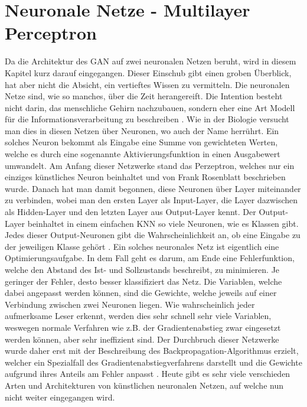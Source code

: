 \section{Neuronale Netze - Multilayer Perceptron}
Da die Architektur des \Gls{GAN} auf zwei neuronalen Netzen beruht, wird in diesem Kapitel kurz darauf eingegangen. Dieser
Einschub gibt einen groben Überblick, hat aber nicht die Absicht, ein vertieftes Wissen zu vermitteln.
\para
Die neuronalen Netze sind, wie so manches, über die Zeit herangereift. Die Intention besteht nicht darin, das menschliche Gehirn
nachzubauen, sondern eher eine Art Modell für die Informationsverarbeitung zu beschreiben \cite{wiki:knn}. Wie in der Biologie versucht man dies
in diesen Netzen über Neuronen, wo auch der Name herrührt. Ein solches
Neuron bekommt als Eingabe eine Summe von gewichteten Werten, welche es durch eine sogenannte \glqq Aktivierungsfunktion\grqq{} in
einen Ausgabewert umwandelt.
\para
Am Anfang dieser Netzwerke stand das Perzeptron, welches nur ein
einziges künstliches Neuron beinhaltet und von Frank Rosenblatt beschrieben wurde.\cite{wiki:perzeptron} Danach hat man damit
begonnen, diese Neuronen über Layer miteinander zu verbinden, wobei man den ersten Layer als Input-Layer, die Layer dazwischen
als Hidden-Layer und den letzten Layer aus Output-Layer kennt. Der Output-Layer beinhaltet in einem einfachen \Gls{KNN} so viele
Neuronen, wie es Klassen gibt. Jedes dieser Output-Neuronen gibt die Wahrscheinlichkeit an, ob eine Eingabe zu der jeweiligen
Klasse gehört \cite{wiki:knn}.
\para
Ein solches neuronales Netz ist eigentlich eine Optimierungsaufgabe. In dem Fall geht es darum, am Ende eine Fehlerfunktion, welche
den Abstand des Ist- und Sollzustands beschreibt, zu minimieren. Je geringer der Fehler, desto besser klassifiziert das Netz. Die
Variablen, welche dabei angepasst werden können, sind die Gewichte, welche jeweils auf einer Verbindung zwischen zwei Neuronen liegen.
Wie wahrscheinlich jeder aufmerksame Leser erkennt, werden dies sehr schnell sehr viele Variablen, weswegen normale Verfahren wie
z.B. der Gradientenabstieg zwar eingesetzt werden können, aber sehr ineffizient sind.
Der Durchbruch dieser Netzwerke wurde daher erst mit der Beschreibung des \Gls{Backpropagation}-Algorithmus erzielt, welcher ein Spezialfall
des Gradientenabstiegverfahrens darstellt und die Gewichte aufgrund ihres Anteils am Fehler anpasst \cite{wiki:backpropagation}.
Heute gibt es sehr viele verschieden Arten und Architekturen von künstlichen neuronalen Netzen, auf welche nun nicht weiter eingegangen
wird.


